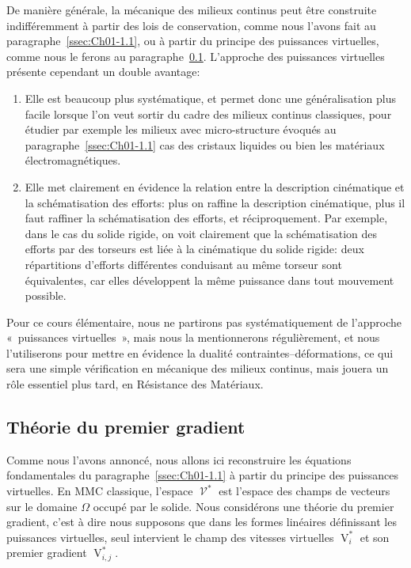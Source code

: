 De manière générale, la mécanique des milieux continus peut être construite indifféremment à partir des lois de conservation, comme nous l'avons fait au paragraphe~\ref{ssec:Ch01-1.1}, ou à partir du principe des puissances virtuelles, comme nous le ferons au paragraphe~\ref{ssec:Ch01-2.3}.
L'approche des puissances virtuelles présente cependant un double avantage:
\begin{enumerate}
    \item Elle est beaucoup plus systématique, et permet donc une généralisation plus facile lorsque l'on veut sortir du cadre des milieux continus classiques, pour étudier par exemple les milieux avec micro-structure évoqués au paragraphe~\ref{ssec:Ch01-1.1} cas des cristaux liquides ou bien les matériaux électromagnétiques.
    \item Elle met clairement en évidence la relation entre la description cinématique et la schématisation des efforts: plus on raffine la description cinématique, plus il faut raffiner la schématisation des efforts, et réciproquement.
        Par exemple, dans le cas du solide rigide, on voit clairement que la schématisation des efforts par des torseurs est liée à la cinématique du solide rigide: deux répartitions d'efforts différentes conduisant au même torseur sont équivalentes, car elles développent la même puissance dans tout mouvement possible.
\end{enumerate}

Pour ce cours élémentaire, nous ne partirons pas systématiquement de l'approche «~puissances virtuelles~», mais nous la mentionnerons régulièrement, et nous l'utiliserons pour mettre en évidence la dualité contraintes--déformations, ce qui sera une simple vérification en mécanique des milieux continus, mais jouera un rôle essentiel plus tard, en Résistance des Matériaux.

\subsection{Théorie du premier gradient} \label{ssec:Ch01-2.3}
Comme nous l'avons annoncé, nous allons ici reconstruire les équations fondamentales du paragraphe~\ref{ssec:Ch01-1.1} à partir du principe des puissances virtuelles.
En MMC classique, l'espace $\mathop{\mathcal{V}}^{\ast}$ est l'espace des champs de vecteurs sur le domaine $\Omega$ occupé par le solide.
Nous considérons une théorie du premier gradient, c'est à dire nous supposons que dans les formes linéaires définissant les puissances virtuelles, seul intervient le champ des vitesses virtuelles $\mathop{V}^{\ast}_i$ et son premier gradient $\mathop{V}^{\ast}_{i,j}$.

